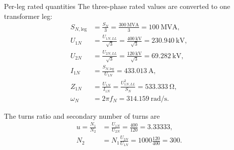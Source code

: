 \begin{formulaBox}{Per-leg rated quantities}
	The three-phase rated values are converted to one transformer leg:
	\begin{align}
		S_{N,\mathrm{leg}}
		&=\frac{S_N}{3}
		=\frac{\SI{300}{\mega\volt\ampere}}{3}
		=\SI{100}{\mega\volt\ampere},\\
		U_{1N}
		&=\frac{U_{1N,LL}}{\sqrt{3}}
		=\frac{\SI{400}{\kilo\volt}}{\sqrt{3}}
		=\SI{230.940}{\kilo\volt},\\
		U_{2N}
		&=\frac{U_{2N,LL}}{\sqrt{3}}
		=\frac{\SI{120}{\kilo\volt}}{\sqrt{3}}
		=\SI{69.282}{\kilo\volt},\\
		I_{1N}
		&=\frac{S_{N,\mathrm{leg}}}{U_{1N}}
		=\SI{433.013}{\ampere},\\
		Z_{1N}
		&=\frac{U_{1N}}{I_{1N}}
		=\frac{U_{1N,LL}^{2}}{S_N}
		=\SI{533.333}{\ohm},\\
		\omega_N
		&=2\pi f_N
		=\SI{314.159}{\radian\per\second}.
	\end{align}
	
	The turns ratio and secondary number of turns are
	\begin{align}
		u=\frac{N_1}{N_2}
		&=\frac{U_{1N}}{U_{2N}}
		=\frac{400}{120}
		=3.33333,\\
		N_2&=N_1\frac{U_{2N}}{U_{1N}}
		=1000\frac{120}{400}
		=\boxed{300}.
	\end{align}
\end{formulaBox}

